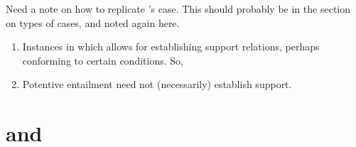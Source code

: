{
  \color{red}

  \begin{note}
    Need a note on how to replicate \citeauthor{Easwaran:2009tm}'s case.
    This should probably be in the section on types of cases, and noted again here.
  \end{note}
}

\begin{note}[Summary]
  \begin{enumerate}
  \item Instances in which \gsi{} allows for establishing support relations, perhaps conforming to certain conditions. So,
  \item Potentive entailment need not (necessarily) establish support.
  \end{enumerate}
\end{note}

\section{\AR{} and \WR{}}
\label{sec:ar-wr}


